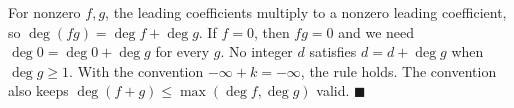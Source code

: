 For nonzero $f,g$, the leading coefficients multiply to a nonzero leading coefficient, so $\deg(fg)=\deg f+\deg g$. If $f=0$, then $fg=0$ and we need $\deg0=\deg0+\deg g$ for every $g$. No integer $d$ satisfies $d=d+\deg g$ when $\deg g\ge1$. With the convention $-\infty+k=-\infty$, the rule holds. The convention also keeps $\deg(f+g)\le\max(\deg f,\deg g)$ valid. $\blacksquare$
